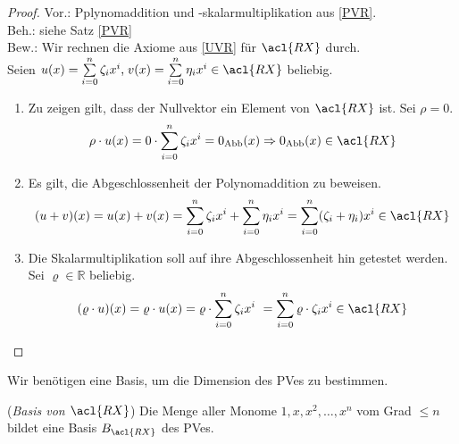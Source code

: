 \begin{proof}
Vor.: Pplynomaddition und -skalarmultiplikation aus \ref{PVR}.
\\ Beh.: siehe Satz \ref{PVR}
\\ Bew.: Wir rechnen die Axiome aus \ref{UVR} für $\acl{RX}$ durch.
\\ Seien $u(x)=\sum\limits_{i=0}^{n} \zeta_i x^i\text{,}\; v(x) = \sum\limits_{i=0}^{n} \eta_i x^i \in \acl{RX}$ beliebig.
\begin{enumerate}
\item Zu zeigen gilt, dass der Nullvektor ein Element von $\acl{RX}$ ist. Sei $\rho = 0$. \[\rho \cdot u(x)= 0 \cdot \sum\limits_{i=0}^{n} \zeta_i x^i = 0_{\Abb}(x) \Rightarrow 0_{\Abb}(x) \in \acl{RX}\]
\item Es gilt, die Abgeschlossenheit der Polynomaddition zu beweisen.
\\ \[ (u+v)(x)=u(x) + v(x) = \sum\limits_{i=0}^{n} \zeta_i x^i+\sum\limits_{i=0}^{n} \eta_i x^i =\sum\limits_{i=0}^{n} (\zeta_i+ \eta_i )x^i \in \acl{RX} \]
\item Die Skalarmultiplikation soll auf ihre Abgeschlossenheit hin getestet werden. Sei $\varrho \in \mathbb{R}$ beliebig.
\[(\varrho \cdot u)(x) = \varrho \cdot u(x)= \varrho \cdot \sum\limits_{i=0}^{n} \zeta_i x^i\ = \sum\limits_{i=0}^{n} \varrho \cdot \zeta_i x^i \in \acl{RX}\qedhere\]
\end{enumerate}
\end{proof}
Wir benötigen eine Basis, um die Dimension des \acl{PV}es zu bestimmen. 
\theoremstyle{Lemma}
\begin{Lemma}({\emph{Basis von $\acl{RX}$}}) Die Menge aller Monome $1, x, x^2,…, x^n$ vom Grad $\leq n$ bildet eine Basis $B_{\acl{RX}}$ des \acl{PV}es. 
\end{Lemma}
